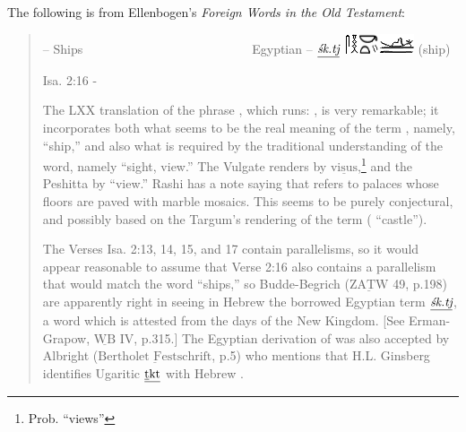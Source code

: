 The following is from Ellenbogen's \emph{Foreign Words in the Old Testament}:
\begin{quotation}
    {\noindent{} -- Ships~~~~~~~~~~~~~~~~~~~~~~~~~~~Egyptian -- $\underline{\emph{\'sk.tj}}$ \includegraphics[scale=1.1]{images/egt-ship} (ship)}
    
    {\noindent Isa. 2:16 -}
    
    The LXX translation of the phrase , which runs: , is very remarkable; it incorporates both what seems to be the real meaning of the term , namely,  ``ship,'' and also what is required by the traditional understanding of the word, namely  ``sight, view.'' The Vulgate renders  by $\underline{\text{visus}}$,\footnote{Prob. ``views''} and the Peshitta by  ``view.'' Rashi has a note saying that  refers to palaces whose floors are paved with marble mosaics. This seems to be purely conjectural, and possibly based on the Targum's rendering of the term ( ``castle'').
    
    The Verses Isa. 2:13, 14, 15, and 17 contain parallelisms, so it would appear reasonable to assume that Verse 2:16 also contains a parallelism that would match the word  ``ships,'' so Budde-Begrich ($\underline{\text{ZATW}}$ 49, p.198) are apparently right in seeing in Hebrew  the borrowed Egyptian term $\underline{\emph{\'sk.tj}}$, a word which is attested from the days of the New Kingdom. [See Erman-Grapow, $\underline{\text{WB}}$ IV, p.315.] The Egyptian derivation of  was also accepted by Albright ($\underline{\text{Bertholet Festschrift}}$, p.5) who mentions that H.L. Ginsberg identifies Ugaritic $\underline{\text{\underline{t}kt}}$ with Hebrew .
\end{quotation}
